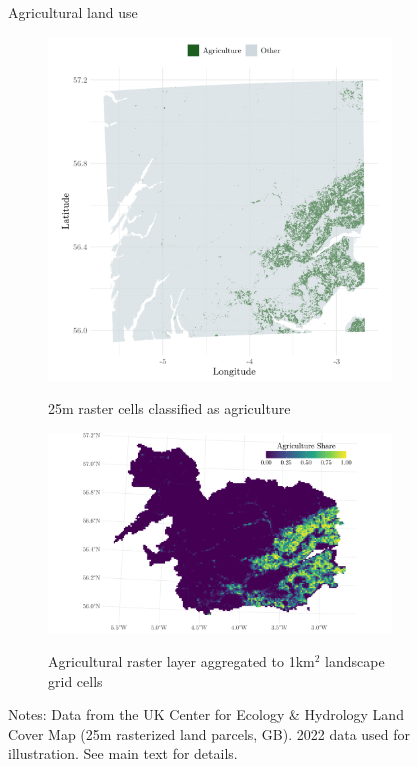 \begin{figure}
    \centering
    \caption{Agricultural land use}
    \begin{subfigure}{0.39\linewidth}
        \caption{\centering 25m raster cells classified as agriculture}
        \includegraphics[width=\linewidth]{output/figures/lcm_in_study_area.png}
        \label{fig:ukceh-lcm-raw}    
    \end{subfigure}
    \begin{subfigure}{0.58\linewidth}
        \caption{\centering Agricultural raster layer aggregated to 1km$^2$ landscape grid cells}    
        \includegraphics[width=\linewidth]{output/figures/lcm_agg_river_grid.pdf}
        \label{fig:ukceh-lcm-agg}
    \end{subfigure}
    \caption*{\justifying \footnotesize Notes: Data from the UK Center for Ecology \& Hydrology Land Cover Map (25m rasterized land parcels, GB). 2022 data used for illustration. See main text for details.}
\end{figure}


